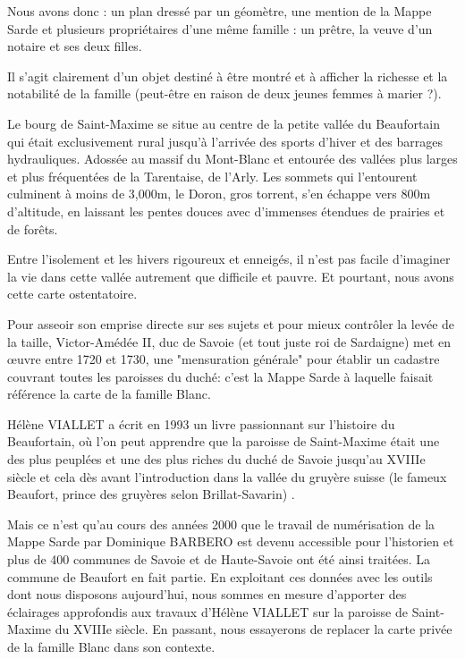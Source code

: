 \documentclass[12pt,a4paper]{report}
\begin{document}
Nous avons donc : un plan dressé par un géomètre, une mention de la Mappe Sarde et plusieurs propriétaires d'une même famille : un prêtre, la veuve d'un notaire et ses deux filles.

Il s'agit clairement d'un objet destiné à être montré et à afficher la richesse et la notabilité de la famille (peut-être en raison de deux jeunes femmes à marier ?).

Le bourg de Saint-Maxime se situe au centre de la petite vallée du Beaufortain qui était exclusivement rural jusqu'à l'arrivée des sports d'hiver et des barrages hydrauliques. Adossée au massif du Mont-Blanc et entourée des vallées plus larges et plus fréquentées de la Tarentaise, de l'Arly. Les sommets qui l'entourent culminent à moins de 3,000m, le Doron, gros torrent, s'en échappe vers 800m d'altitude, en laissant les pentes douces avec d'immenses étendues de prairies et de forêts. 

Entre l'isolement et les hivers rigoureux et enneigés, il n'est pas facile d'imaginer la vie dans cette vallée autrement que difficile et pauvre. 
Et pourtant, nous avons cette carte ostentatoire.

\vspace{1em}

Pour asseoir son emprise directe sur ses sujets et pour mieux contrôler la levée de la taille,  Victor-Amédée II, duc de Savoie (et tout juste roi de Sardaigne) met en œuvre entre 1720 et 1730, une "mensuration générale" pour établir un cadastre couvrant toutes les paroisses du duché: c'est la Mappe Sarde à laquelle faisait référence la carte de la famille Blanc.   

Hélène VIALLET a écrit en 1993 un livre passionnant sur l'histoire du Beaufortain, où l'on peut apprendre que la paroisse de Saint-Maxime était une des plus peuplées et une des plus riches du duché de Savoie jusqu'au XVIIIe siècle et cela dès avant l'introduction dans la vallée du gruyère suisse (le fameux Beaufort, prince des gruyères selon Brillat-Savarin) .

Mais ce n'est qu'au cours des années 2000 que le travail de numérisation de la Mappe Sarde par Dominique BARBERO est devenu accessible pour l'historien et  plus de 400 communes de Savoie et de Haute-Savoie ont été ainsi traitées. La commune de Beaufort en fait partie. En exploitant ces données avec les outils dont nous disposons aujourd'hui, nous sommes en mesure d'apporter des éclairages approfondis aux travaux d'Hélène VIALLET sur la paroisse de Saint-Maxime du XVIIIe siècle. En passant, nous essayerons de replacer la carte privée de la famille Blanc dans son contexte.
\end{document}
